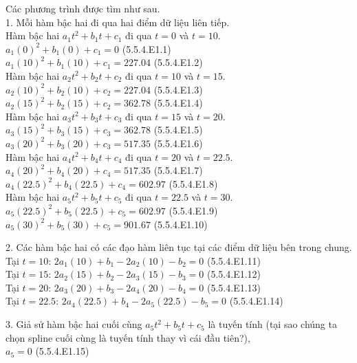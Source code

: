Các phương trình được tìm như sau. \\
1. Mỗi hàm bậc hai đi qua hai điểm dữ liệu liên tiếp. \\
Hàm bậc hai $a_{1}t^{2}+b_{1}t+c_{1}$ đi qua $t=0$ và $t=10$. \\
$a_{1}(0)^{2}+b_{1}(0)+c_{1}=0$ (5.5.4.E1.1) \\
$a_{1}(10)^{2}+b_{1}(10)+c_{1}=227.04$ (5.5.4.E1.2) \\
Hàm bậc hai $a_{2}t^{2}+b_{2}t+c_{2}$ đi qua $t=10$ và $t=15$. \\
$a_{2}(10)^{2}+b_{2}(10)+c_{2}=227.04$ (5.5.4.E1.3) \\
$a_{2}(15)^{2}+b_{2}(15)+c_{2}=362.78$ (5.5.4.E1.4) \\
Hàm bậc hai $a_{3}t^{2}+b_{3}t+c_{3}$ đi qua $t=15$ và $t=20$. \\
$a_{3}(15)^{2}+b_{3}(15)+c_{3}=362.78$ (5.5.4.E1.5) \\
$a_{3}(20)^{2}+b_{3}(20)+c_{3}=517.35$ (5.5.4.E1.6) \\
Hàm bậc hai $a_{4}t^{2}+b_{4}t+c_{4}$ đi qua $t=20$ và $t=22.5$. \\
$a_{4}(20)^{2}+b_{4}(20)+c_{4}=517.35$ (5.5.4.E1.7) \\
$a_{4}(22.5)^{2}+b_{4}(22.5)+c_{4}=602.97$ (5.5.4.E1.8) \\
Hàm bậc hai $a_{5}t^{2}+b_{5}t+c_{5}$ đi qua $t=22.5$ và $t=30$. \\
$a_{5}(22.5)^{2}+b_{5}(22.5)+c_{5}=602.97$ (5.5.4.E1.9) \\
$a_{5}(30)^{2}+b_{5}(30)+c_{5}=901.67$ (5.5.4.E1.10) 

2. Các hàm bậc hai có các đạo hàm liên tục tại các điểm dữ liệu bên trong chung. \\
Tại $t=10$: $2a_{1}(10)+b_{1}-2a_{2}(10)-b_{2}=0$ (5.5.4.E1.11) \\
Tại $t=15$: $2a_{2}(15)+b_{2}-2a_{3}(15)-b_{3}=0$ (5.5.4.E1.12) \\
Tại $t=20$: $2a_{3}(20)+b_{3}-2a_{4}(20)-b_{4}=0$ (5.5.4.E1.13) \\
Tại $t=22.5$: $2a_{4}(22.5)+b_{4}-2a_{5}(22.5)-b_{5}=0$ (5.5.4.E1.14)

3. Giả sử hàm bậc hai cuối cùng $a_{5}t^{2}+b_{5}t+c_{5}$ là tuyến tính (tại sao chúng ta chọn spline cuối cùng là tuyến tính thay vì cái đầu tiên?), \\
$a_{5}=0$ (5.5.4.E1.15)

